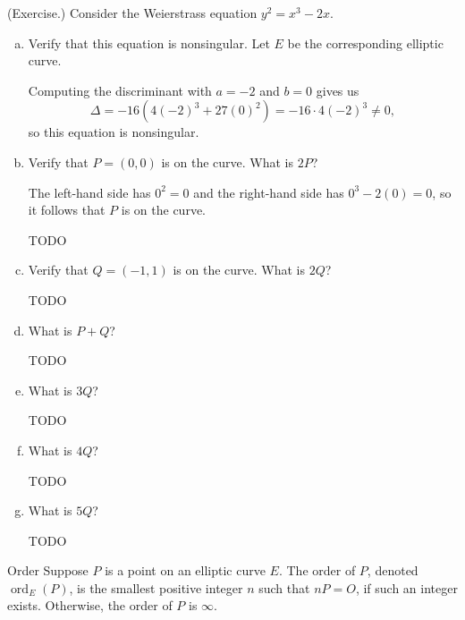 \documentclass[letterpaper]{article}
\DeclareMathOperator{\ord}{ord}
\begin{document}
\begin{mdframed}
    (Exercise.) Consider the Weierstrass equation $y^2 = x^3 - 2x$. 

    \begin{enumerate}[(a)]
        \item Verify that this equation is nonsingular. Let $E$ be the corresponding elliptic curve. 
        \begin{mdframed}
            Computing the discriminant with $a = -2$ and $b = 0$ gives us
            \[\Delta = -16(4(-2)^3 + 27(0)^2) = -16 \cdot 4(-2)^3 \neq 0,\]
            so this equation is nonsingular. 
        \end{mdframed}
        \item Verify that $P = (0, 0)$ is on the curve. What is $2P$? 
        \begin{mdframed}
            The left-hand side has $0^2 = 0$ and the right-hand side has $0^3 - 2(0) = 0$, so it follows that $P$ is on the curve. 

            \bigskip 

            TODO 
        \end{mdframed}
        \item Verify that $Q = (-1, 1)$ is on the curve. What is $2Q$?
        \begin{mdframed}
            TODO 
        \end{mdframed}
        \item What is $P + Q$? 
        \begin{mdframed}
            TODO 
        \end{mdframed}
        \item What is $3Q$? 
        \begin{mdframed}
            TODO 
        \end{mdframed}
        \item What is $4Q$? 
        \begin{mdframed}
            TODO 
        \end{mdframed}
        \item What is $5Q$? 
        \begin{mdframed}
            TODO 
        \end{mdframed}
    \end{enumerate}
\end{mdframed}

\begin{definition}{Order}{}
    Suppose $P$ is a point on an elliptic curve $E$. The order of $P$, denoted $\ord_{E}(P)$, is the smallest positive integer $n$ such that $nP = O$, if such an integer exists. Otherwise, the order of $P$ is $\infty$. 
\end{definition}
\end{document}
